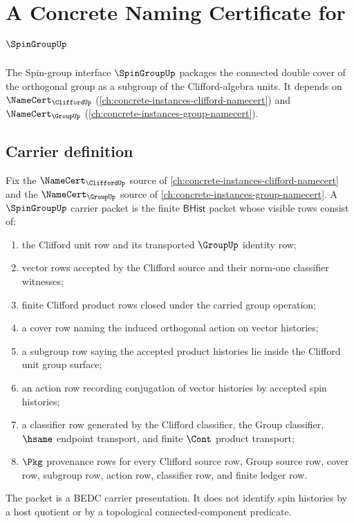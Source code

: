 \chapter{A Concrete Naming Certificate for $\SpinGroupUp$}
\label{ch:concrete-instances-spingroup-namecert}

The Spin-group interface $\SpinGroupUp$ packages the connected double cover of the orthogonal group as a subgroup of the Clifford-algebra units. It depends on $\NameCert_{\CliffordUp}$ (\autoref{ch:concrete-instances-clifford-namecert}) and $\NameCert_{\GroupUp}$ (\autoref{ch:concrete-instances-group-namecert}).

\section{Carrier definition}
\label{sec:spingroup-carrier}

\begin{definition}
\label{def:spingroup-bhist-carrier-packet}
Fix the $\NameCert_{\CliffordUp}$ source of
\autoref{ch:concrete-instances-clifford-namecert} and the
$\NameCert_{\GroupUp}$ source of
\autoref{ch:concrete-instances-group-namecert}. A
$\SpinGroupUp$ carrier packet is the finite $\mathsf{BHist}$ packet whose
visible rows consist of:
\begin{enumerate}
\item the Clifford unit row and its transported $\GroupUp$ identity row;
\item vector rows accepted by the Clifford source and their norm-one
classifier witnesses;
\item finite Clifford product rows closed under the carried group operation;
\item a cover row naming the induced orthogonal action on vector histories;
\item a subgroup row saying the accepted product histories lie inside the
Clifford unit group surface;
\item an action row recording conjugation of vector histories by accepted
spin histories;
\item a classifier row generated by the Clifford classifier, the Group
classifier, $\hsame$ endpoint transport, and finite $\Cont$ product
transport;
\item $\Pkg$ provenance rows for every Clifford source row, Group source row,
cover row, subgroup row, action row, classifier row, and finite ledger row.
\end{enumerate}
The packet is a BEDC carrier presentation. It does not identify spin histories
by a host quotient or by a topological connected-component predicate.
\end{definition}

